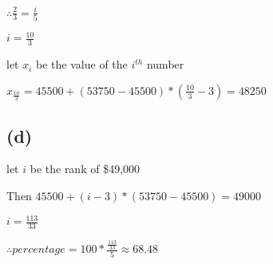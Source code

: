 \documentclass[12pt]{article}
\begin{document}
\begin{spacing}{2.0}
$\therefore \frac{2}{3}=\frac{i}{5}$

$i=\frac{10}{3}$

let $x_{i}$ be the value of the $i^{th}$ number

$x_{\frac{10}{3}}=45500+(53750-45500)*(\frac{10}{3}-3)=48250$

\subsection*{(d)}
let $i$ be the rank of \$49,000

Then $45500+(i-3)*(53750-45500)=49000$

$i=\frac{113}{33}$

$\therefore percentage=100*\frac{\frac{113}{33}}{5} \approx 68.48$


\end{spacing}
\end{document}

